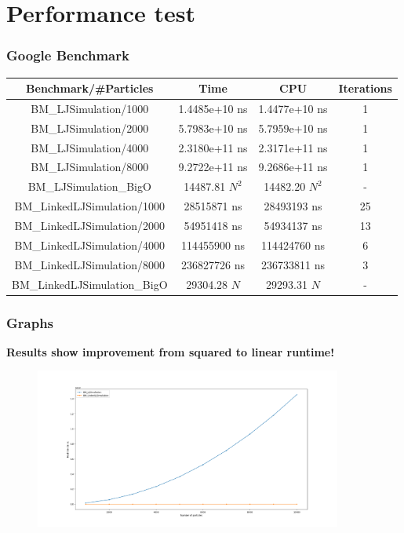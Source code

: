 
\section{Performance test}
\label{sec:perf}

\begin{frame}
    \frametitle{Google Benchmark}
    \begin{table}
        \centering
    \begin{tabular}{|c|c|c|c|}
        \toprule
        Benchmark/\#Particles & Time & CPU & Iterations \\
        \toprule
        BM\_LJSimulation/1000 & 1.4485e+10 ns & 1.4477e+10 ns & 1 \\
        \midrule
        BM\_LJSimulation/2000 & 5.7983e+10 ns & 5.7959e+10 ns & 1 \\
        \midrule
        BM\_LJSimulation/4000 & 2.3180e+11 ns & 2.3171e+11 ns & 1 \\
        \midrule
        BM\_LJSimulation/8000 & 9.2722e+11 ns & 9.2686e+11 ns & 1 \\
        \midrule
        BM\_LJSimulation\_BigO & 14487.81 $N^2$ & 14482.20 $N^2$ & - \\
        \midrule
        BM\_LinkedLJSimulation/1000 & 28515871 ns & 28493193 ns & 25 \\
        \midrule
        BM\_LinkedLJSimulation/2000 & 54951418 ns & 54934137 ns & 13 \\
        \midrule
        BM\_LinkedLJSimulation/4000 & 114455900 ns & 114424760 ns & 6 \\
        \midrule
        BM\_LinkedLJSimulation/8000 & 236827726 ns & 236733811 ns & 3 \\
        \midrule
        BM\_LinkedLJSimulation\_BigO & 29304.28 $N$ & 29293.31 $N$ & - \\
        \bottomrule
    \end{tabular}
    \end{table}
\end{frame}

\begin{frame}
    \frametitle{Graphs}
    \textbf{Results show improvement from squared to linear runtime!}
    \begin{figure}
        \label{fig:timelc}
        \includegraphics[width=0.9\textwidth]{../../res/lj_big_plot_linear}
    \end{figure}
\end{frame}

